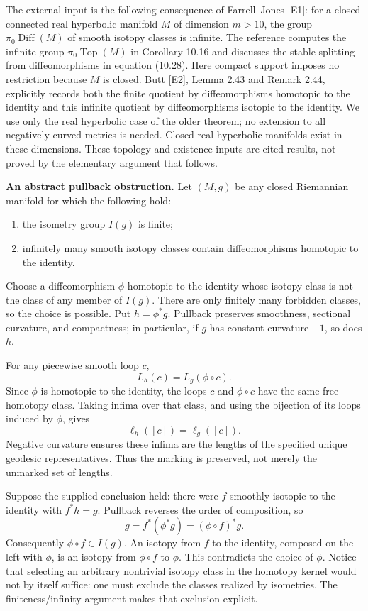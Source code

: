 \documentclass[11pt]{article}
\begin{document}
The external input is the following consequence of Farrell--Jones [E1]: for a
closed connected real hyperbolic manifold $M$ of dimension $m>10$, the group
$\pi_0\operatorname{Diff}(M)$ of smooth isotopy classes is infinite.
The reference computes the infinite group $\pi_0\operatorname{Top}(M)$ in
Corollary 10.16 and discusses the stable splitting from diffeomorphisms in
equation (10.28).  Here compact support imposes no restriction because $M$ is
closed.  Butt [E2], Lemma 2.43 and Remark 2.44, explicitly records both the
finite quotient by diffeomorphisms homotopic to the identity and this infinite
quotient by diffeomorphisms isotopic to the identity.  We use only the real
hyperbolic case of the older theorem; no extension to all negatively curved
metrics is needed.  Closed real hyperbolic manifolds exist in these dimensions.
These topology and existence inputs are cited results, not proved by the
elementary argument that follows.

\textbf{An abstract pullback obstruction.}
Let $(M,g)$ be any closed Riemannian manifold for which the following hold:
\begin{enumerate}
\item the isometry group $I(g)$ is finite;
\item infinitely many smooth isotopy classes contain diffeomorphisms homotopic
to the identity.
\end{enumerate}
Choose a diffeomorphism $\phi$ homotopic to the identity whose isotopy class is
not the class of any member of $I(g)$.  There are only finitely many forbidden
classes, so the choice is possible.  Put $h=\phi^*g$.  Pullback preserves smoothness,
sectional curvature, and compactness; in particular, if $g$ has constant
curvature $-1$, so does $h$.

For any piecewise smooth loop $c$,
\[
 L_h(c)=L_g(\phi\circ c).
\]
Since $\phi$ is homotopic to the identity, the loops $c$ and $\phi\circ c$ have
the same free homotopy class.  Taking infima over that class, and using the
bijection of its loops induced by $\phi$, gives
\[
 \ell_h([c])=\ell_g([c]).
\]
Negative curvature ensures these infima are the lengths of the specified
unique geodesic representatives.  Thus the marking is preserved, not merely
the unmarked set of lengths.

Suppose the supplied conclusion held: there were $f$ smoothly isotopic to the
identity with $f^*h=g$.  Pullback reverses the order of composition, so
\[
 g=f^*(\phi^*g)=(\phi\circ f)^*g.
\]
Consequently $\phi\circ f\in I(g)$.  An isotopy from $f$ to the identity,
composed on the left with $\phi$, is an isotopy from $\phi\circ f$ to $\phi$.
This contradicts the choice of $\phi$.  Notice that selecting an arbitrary
nontrivial isotopy class in the homotopy kernel would not by itself suffice:
one must exclude the classes realized by isometries.  The finiteness/infinity
argument makes that exclusion explicit.
\end{document}
